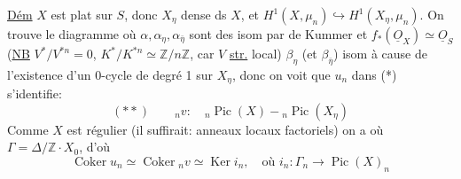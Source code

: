\uline{Dém} $X$ est plat sur $S$, donc $X_\eta$ dense ds $X$, et $H^1(X,\mu_n)\hookrightarrow H^1(X_\eta,\mu_n)$. On trouve le diagramme
où $\alpha,\alpha_\eta,\alpha_{\bar\eta}$ sont des isom par  de Kummer et $f_*(\underline O_X)\simeq\underline O_S$ (\uline{NB} $V^*/V^{*n}=0$, $K^*/K^{*n}\simeq\mathbb Z/n\mathbb Z$, car $V$ \uline{str.} local) $\beta_\eta$ (et $\beta_{\bar\eta}$)  isom à cause de l'existence d'un 0-cycle de degré 1 sur $X_\eta$, donc on voit que $u_n$ dans (*) s'identifie:
\[
(**)\qquad{}_nv:\quad{}_n\operatorname{Pic}(X)\mathbin{-}{}_n\operatorname{Pic}(X_\eta)
\]
Comme $X$ est régulier (il suffirait: anneaux locaux factoriels) on a
où $\Gamma=\Delta/\mathbb Z\cdot X_0$, d'où
\[
\operatorname{Coker}u_n\simeq\operatorname{Coker}{}_nv\simeq\operatorname{Ker}i_n,\quad\text{où }i_n:\Gamma_n\longrightarrow\operatorname{Pic}(X)_n
\]

